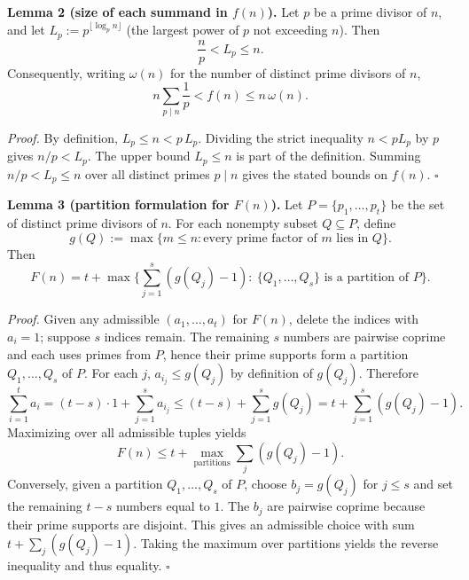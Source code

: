 \medskip
\noindent\textbf{Lemma 2 (size of each summand in $f(n)$).}
Let $p$ be a prime divisor of $n$, and let $L_p:=p^{\lfloor\log_p n\rfloor}$ (the largest power of $p$ not exceeding $n$).
Then
\[
 \frac{n}{p} < L_p \le n.
\]
Consequently, writing $\omega(n)$ for the number of distinct prime divisors of $n$,
\[
 n\sum_{p\mid n}\frac{1}{p} < f(n)\le n\,\omega(n).
\]

\noindent\emph{Proof.}
By definition, $L_p\le n < p\,L_p$. Dividing the strict inequality $n < p L_p$ by $p$ gives $n/p < L_p$.
The upper bound $L_p\le n$ is part of the definition.
Summing $n/p < L_p\le n$ over all distinct primes $p\mid n$ gives the stated bounds on $f(n)$.
\hfill$\square$

\medskip
\noindent\textbf{Lemma 3 (partition formulation for $F(n)$).}
Let $P=\{p_1,\dots,p_t\}$ be the set of distinct prime divisors of $n$.
For each nonempty subset $Q\subseteq P$, define
\[
 g(Q):=\max\{m\le n: \text{every prime factor of }m\text{ lies in }Q\}.
\]
Then
\[
F(n)=t+\max\Big\{\sum_{j=1}^s (g(Q_j)-1):\ \{Q_1,\dots,Q_s\}\text{ is a partition of }P\Big\}.
\]

\noindent\emph{Proof.}
Given any admissible $(a_1,\dots,a_t)$ for $F(n)$, delete the indices with $a_i=1$; suppose $s$ indices remain. The remaining $s$ numbers are pairwise coprime and each uses primes from $P$, hence their prime supports form a partition $Q_1,\dots,Q_s$ of $P$.
For each $j$, $a_{i_j}\le g(Q_j)$ by definition of $g(Q_j)$. Therefore
\[
\sum_{i=1}^t a_i = (t-s)\cdot 1 + \sum_{j=1}^s a_{i_j} \le (t-s)+\sum_{j=1}^s g(Q_j)= t+\sum_{j=1}^s(g(Q_j)-1).
\]
Maximizing over all admissible tuples yields
\[
F(n)\le t+\max_{\text{partitions}}\sum_{j}(g(Q_j)-1).
\]
Conversely, given a partition $Q_1,\dots,Q_s$ of $P$, choose $b_j=g(Q_j)$ for $j\le s$ and set the remaining $t-s$ numbers equal to $1$.
The $b_j$ are pairwise coprime because their prime supports are disjoint. This gives an admissible choice with sum
$t+\sum_j(g(Q_j)-1)$.
Taking the maximum over partitions yields the reverse inequality and thus equality.
\hfill$\square$

